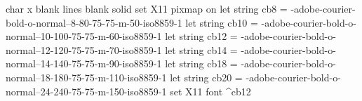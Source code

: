 char x blank
lines blank solid
set X11 pixmap on
let string cb8  = -adobe-courier-bold-o-normal--8-80-75-75-m-50-iso8859-1
let string cb10 = -adobe-courier-bold-o-normal--10-100-75-75-m-60-iso8859-1
let string cb12 = -adobe-courier-bold-o-normal--12-120-75-75-m-70-iso8859-1
let string cb14 = -adobe-courier-bold-o-normal--14-140-75-75-m-90-iso8859-1
let string cb18 = -adobe-courier-bold-o-normal--18-180-75-75-m-110-iso8859-1
let string cb20 = -adobe-courier-bold-o-normal--24-240-75-75-m-150-iso8859-1
set X11 font ^cb12
